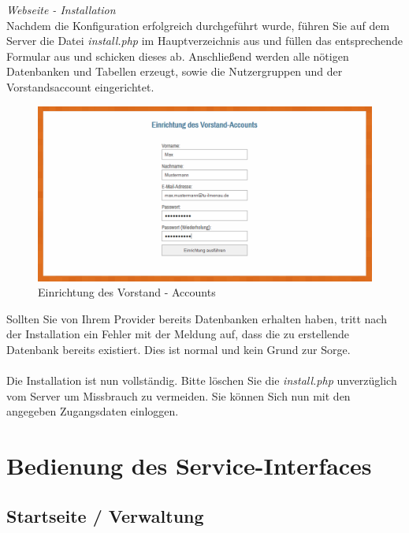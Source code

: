 \documentclass[fontsize = 12pt, paper = a4]{scrreprt}
\begin{document}
\newpage


\textit{Webseite - Installation} \\

Nachdem die Konfiguration erfolgreich durchgeführt wurde, führen Sie auf dem Server die Datei \textit{install.php} im Hauptverzeichnis aus und füllen das entsprechende Formular aus und schicken dieses ab. Anschließend werden alle nötigen Datenbanken und Tabellen erzeugt, sowie die Nutzergruppen und der Vorstandsaccount eingerichtet.

\begin{figure}[h]
\centering
\includegraphics[scale = 0.50]{install}
\caption[Einrichtung des Vorstand - Accounts]{Einrichtung des Vorstand - Accounts}
\label{installvorstand}
\end{figure} 


Sollten Sie von Ihrem Provider bereits Datenbanken erhalten haben, tritt nach der Installation ein Fehler mit der Meldung auf, dass die zu erstellende Datenbank bereits existiert. Dies ist normal und kein Grund zur Sorge. \\ \\

Die Installation ist nun vollständig. Bitte löschen Sie die \textit{install.php} unverzüglich vom Server um Missbrauch zu vermeiden. Sie können Sich nun mit den angegeben Zugangsdaten einloggen.





\chapter{Bedienung des Service-Interfaces}

\section{Startseite / Verwaltung}
\end{document}
